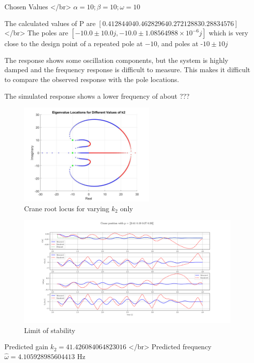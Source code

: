 \documentclass{article}
\begin{document}
Chosen Values </br>
$\alpha = 10; \beta = 10; \omega = 10$

The calculated values of P are $[0.41284404 0.46282964 0.27212883 0.28834576]$ </br>
The poles are $[-10.0 \pm 10.0j, -10.0\pm 1.08564988\times 10^{-6}j ]$ which is very close to the design point of a repeated pole at $-10$, and poles at -$10\pm 10j$

The response shows some oscillation components, but the system is highly damped and the frequency response is difficult to measure.
This makes it difficult to compare the observed response with the pole locations.

The simulated response shows a lower frequency of about ???


\begin{figure}[H]
  \centering
  \includegraphics[width=0.6\textwidth]{figures/3.5roots.jpg}
  \caption{Crane root locus for varying $k_2$ only}
  \label{fig:roots3.5}
\end{figure}

\begin{figure}[H]
  \centering
  \includegraphics[width=0.99\textwidth]{figures/3.5.png}
  \caption{Limit of stability}
  \label{fig:exp3.5}
\end{figure}

Predicted gain $k_2 =   41.426084064823016$ </br>
Predicted frequency $\hat{\omega} = 4.105928985604413$ Hz
\end{document}
